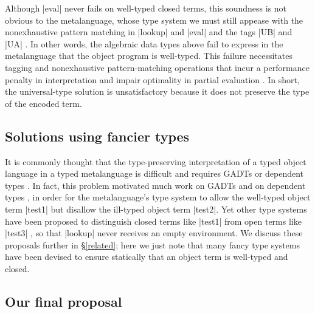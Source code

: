 Although |eval| never fails on
well-typed closed terms, this soundness is not obvious to the
metalanguage, whose type system we must still appease with the
nonexhaustive pattern matching in |lookup| and |eval| and the tags |UB|
and |UA| \citep[\S1.4]{WalidICFP02}.  In other words, the algebraic data
types above fail to express in the metalanguage that the object program
is well-typed.  This failure necessitates tagging and nonexhaustive
pattern\hyp matching operations that incur a performance penalty in
interpretation \citep{WalidICFP02} and impair optimality in partial evaluation
\citep{taha-tag}.  In short, the universal\hyp type solution is
unsatisfactory because it does not preserve the type of the encoded term.

\ifshort\else\subsection{Solutions using fancier types}\fi

It is commonly thought that the type-preserving interpretation of
a typed object language in a typed metalanguage is difficult and requires
GADTs or dependent types \citep{taha-tag}.  In fact, this problem
motivated much work on GADTs \citep{xi-guarded,peyton-jones-simple} and
on dependent types \citep{WalidICFP02,fogarty-concoqtion}\ifshort\else,
in order for the metalanguage's type system to allow the well-typed object term
|test1| but disallow the ill-typed object term |test2|\fi.
Yet other type systems
have been proposed to distinguish closed terms like |test1| from open
terms 
\ifshort\citep{WalidPOPL03,NanevskiJFP05,DaviesJACM01}\else
like |test3|
\citep{WalidPOPL03,NanevskiICFP02,NanevskiJFP05,DaviesJACM01,nanevski-contextual}\fi,
so that |lookup| never receives an empty environment.  We discuss these
proposals further in \S\ref{related}\ifshort\else;
here we just note that many
fancy type systems have been devised to ensure statically that an
object term is well-typed and closed\fi.

\subsection{Our final proposal}\label{ourapproach}

